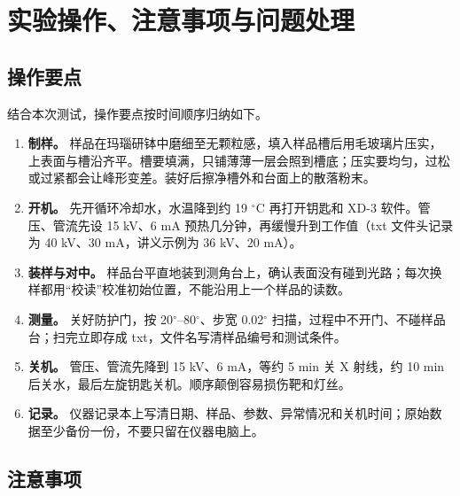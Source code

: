 \clearpage
\section{实验操作、注意事项与问题处理}

\subsection{操作要点}

结合本次测试，操作要点按时间顺序归纳如下。

\begin{enumerate}[label=（\arabic*）,leftmargin=2.2em]
  \item \textbf{制样。} 样品在玛瑙研钵中磨细至无颗粒感，填入样品槽后用毛玻璃片压实，上表面与槽沿齐平。槽要填满，只铺薄薄一层会照到槽底；压实要均匀，过松或过紧都会让峰形变差。装好后擦净槽外和台面上的散落粉末。
  \item \textbf{开机。} 先开循环冷却水，水温降到约 19 $^\circ$C 再打开钥匙和 XD-3 软件。管压、管流先设 15 kV、6 mA 预热几分钟，再缓慢升到工作值（txt 文件头记录为 40 kV、30 mA，讲义示例为 36 kV、20 mA）。
  \item \textbf{装样与对中。} 样品台平直地装到测角台上，确认表面没有碰到光路；每次换样都用“校读”校准初始位置，不能沿用上一个样品的读数。
  \item \textbf{测量。} 关好防护门，按 20$^\circ$--80$^\circ$、步宽 0.02$^\circ$ 扫描，过程中不开门、不碰样品台；扫完立即存成 txt，文件名写清样品编号和测试条件。
  \item \textbf{关机。} 管压、管流先降到 15 kV、6 mA，等约 5 min 关 X 射线，约 10 min 后关水，最后左旋钥匙关机。顺序颠倒容易损伤靶和灯丝。
  \item \textbf{记录。} 仪器记录本上写清日期、样品、参数、异常情况和关机时间；原始数据至少备份一份，不要只留在仪器电脑上。
\end{enumerate}

\subsection{注意事项}

